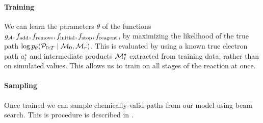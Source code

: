 \paragraph{Training}
We can learn the parameters $\theta$ of the functions $g_{{\mathcal{A}}}, f_{\textrm{add}}, f_{\textrm{remove}}, f_{\textrm{initial}},f_{\textrm{stop}}, f_{\textrm{reagent}}$, by maximizing the likelihood of the true path $\log p_\theta({\mathcal{P}}_{0:T} \mid {\mathcal{M}}_0, {\mathcal{M}}_r)$.
This is evaluated by using a known true electron path $a_t^\star$ and intermediate products ${\mathcal{M}}_t^\star$ extracted from training data,
rather than on simulated values. 
This allows us to train on all stages of the reaction at once.

\paragraph{Sampling}
Once trained we can sample chemically-valid paths from our model using beam search.  This is procedure is described in . 



